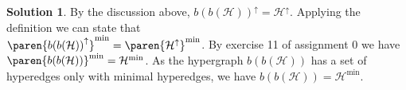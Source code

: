 \documentclass[11pt,leqno,final]{amsart}
\theoremstyle{definition}
\newtheorem{solution}{Solution}
\begin{document}
\begin{solution}
By the discussion above, ${b(b(\mathcal{H}))}^{\uparrow} = \mathcal{H}^{\uparrow}$. Applying the definition we can state that \\$\paren{{b(b(\mathcal{H}))}^{\uparrow}}^{\text{min}} = \paren{\mathcal{H}^{\uparrow}}^{\text{min}}$. By exercise 11 of assignment 0 we have $\paren{b(b(\mathcal{H}))}^{\text{min}} = \mathcal{H}^{\text{min}}$. As the hypergraph $b(b(\mathcal{H}))$ has a set of hyperedges only with minimal hyperedges, we have $b(b(\mathcal{H})) = \mathcal{H}^{\text{min}}$. 

\end{solution}
\end{document}
